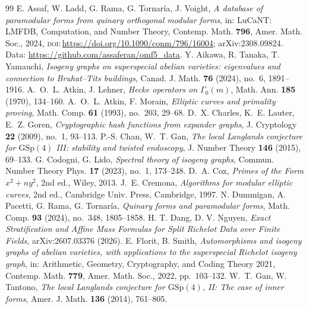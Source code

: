 \documentclass[10pt,a4paper]{amsart}
\providecommand{\doi}[1]{\textsc{doi:}\,\url{https://doi.org/#1}}
\newcommand{\GSp}{\mathrm{GSp}}
\begin{document}
\begin{thebibliography}{99}
 E. Assaf, W. Ladd, G. Rama, G. Tornar\'ia, J. Voight, \emph{A database of paramodular forms from quinary orthogonal modular forms}, in: LuCaNT: LMFDB, Computation, and Number Theory, Contemp. Math. \textbf{796}, Amer. Math. Soc., 2024, \doi{10.1090/conm/796/16004}; arXiv:2308.09824. Data: \url{https://github.com/assaferan/omf5_data}.
 Y. Aikawa, R. Tanaka, T. Yamauchi, \emph{Isogeny graphs on superspecial abelian varieties: eigenvalues and connection to Bruhat--Tits buildings}, Canad. J. Math. \textbf{76} (2024), no.~6, 1891--1916.
 A.~O.~L. Atkin, J. Lehner, \emph{Hecke operators on $\Gamma_0(m)$}, Math. Ann. \textbf{185} (1970), 134--160.
 A.~O.~L. Atkin, F. Morain, \emph{Elliptic curves and primality proving}, Math. Comp. \textbf{61} (1993), no.~203, 29--68.
 D.~X. Charles, K.~E. Lauter, E.~Z. Goren, \emph{Cryptographic hash functions from expander graphs}, J. Cryptology \textbf{22} (2009), no.~1, 93--113.
 P.-S. Chan, W.~T. Gan, \emph{The local Langlands conjecture for $\GSp(4)$ III: stability and twisted endoscopy}, J. Number Theory \textbf{146} (2015), 69--133.
 G. Codogni, G. Lido, \emph{Spectral theory of isogeny graphs}, Commun. Number Theory Phys. \textbf{17} (2023), no.~1, 173--248.
 D.~A. Cox, \emph{Primes of the Form $x^2+ny^2$}, 2nd ed., Wiley, 2013.
 J.~E. Cremona, \emph{Algorithms for modular elliptic curves}, 2nd ed., Cambridge Univ. Press, Cambridge, 1997.
 N. Dummigan, A. Pacetti, G. Rama, G. Tornar\'ia, \emph{Quinary forms and paramodular forms}, Math. Comp. \textbf{93} (2024), no.~348, 1805--1858.
 H. T. Dang, D. V. Nguyen, \emph{Exact Stratification and Affine Mass Formulas for Split Richelot Data over Finite Fields}, arXiv:2607.03376 (2026).
 E. Florit, B. Smith, \emph{Automorphisms and isogeny graphs of abelian varieties, with applications to the superspecial Richelot isogeny graph}, in: Arithmetic, Geometry, Cryptography, and Coding Theory 2021, Contemp. Math. \textbf{779}, Amer. Math. Soc., 2022, pp.~103--132.
 W.~T. Gan, W. Tantono, \emph{The local Langlands conjecture for $\mathrm{GSp}(4)$, II: The case of inner forms}, Amer. J. Math. \textbf{136} (2014), 761--805.

\end{thebibliography}
\end{document}

